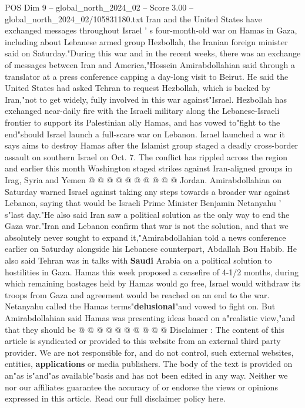 \begin{textsample}{POS Dim 9 – global\_north\_2024\_02 – Score 3.00 – global\_north\_2024\_02/105831180.txt}  \label{ex:f9_pos_157}
Iran and the United States have exchanged messages throughout Israel ' s four-month-old war on Hamas in Gaza, including about Lebanese armed group Hezbollah, the Iranian foreign minister said on Saturday."During this war and in the recent weeks, there was an exchange of messages between Iran and America,"Hossein Amirabdollahian said through a translator at a press conference capping a day-long visit to Beirut.
He said the United States had asked Tehran to request Hezbollah, which is backed by Iran,"not to get widely, fully involved in this war against"Israel.
Hezbollah has exchanged near-daily fire with the Israeli military along the Lebanese-Israeli frontier to support its Palestinian ally Hamas, and has vowed to"fight to the end"should Israel launch a full-scare war on Lebanon.
Israel launched a war it says aims to destroy Hamas after the Islamist group staged a deadly cross-border assault on southern Israel on Oct. 7.
The conflict has rippled across the region and earlier this month Washington staged strikes against Iran-aligned groups in Irag, Syria and Yemen @ @ @ @ @ @ @ @ @ @ Jordan.
Amirabdollahian on Saturday warned Israel against taking any steps towards a broader war against Lebanon, saying that would be Israeli Prime Minister Benjamin Netanyahu ' s"last day."He also said Iran saw a political solution as the only way to end the Gaza war."Iran and Lebanon confirm that war is not the solution, and that we absolutely never sought to expand it,"Amirabdollahian told a news conference earlier on Saturday alongside his Lebanese counterpart, Abdallah Bou Habib.
He also said Tehran was in talks with \textbf{Saudi} Arabia on a political solution to hostilities in Gaza.
Hamas this week proposed a ceasefire of 4-1/2 months, during which remaining hostages held by Hamas would go free, Israel would withdraw its troops from Gaza and agreement would be reached on an end to the war.
Netanyahu called the Hamas terms"\textbf{delusional}"and vowed to fight on.
But Amirabdollahian said Hamas was presenting ideas based on a"realistic view,"and that they should be @ @ @ @ @ @ @ @ @ @ Disclaimer : The content of this article is syndicated or provided to this website from an external third party provider.
We are not responsible for, and do not control, such external websites, entities, \textbf{applications} or media publishers.
The body of the text is provided on an"as is"and"as available"basis and has not been edited in any way.
Neither we nor our affiliates guarantee the accuracy of or endorse the views or opinions expressed in this article.
Read our full disclaimer policy here.

\end{textsample}
